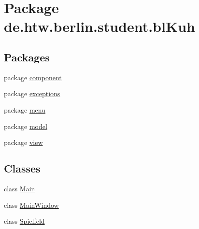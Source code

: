 \hypertarget{namespacede_1_1htw_1_1berlin_1_1student_1_1bl_kuh}{\section{Package de.\-htw.\-berlin.\-student.\-bl\-Kuh}
\label{namespacede_1_1htw_1_1berlin_1_1student_1_1bl_kuh}
}
\subsection*{Packages}
\begin{DoxyCompactItemize}
\item 
package \hyperlink{namespacede_1_1htw_1_1berlin_1_1student_1_1bl_kuh_1_1component}{component}
\item 
package \hyperlink{namespacede_1_1htw_1_1berlin_1_1student_1_1bl_kuh_1_1exceptions}{exceptions}
\item 
package \hyperlink{namespacede_1_1htw_1_1berlin_1_1student_1_1bl_kuh_1_1menu}{menu}
\item 
package \hyperlink{namespacede_1_1htw_1_1berlin_1_1student_1_1bl_kuh_1_1model}{model}
\item 
package \hyperlink{namespacede_1_1htw_1_1berlin_1_1student_1_1bl_kuh_1_1view}{view}
\end{DoxyCompactItemize}
\subsection*{Classes}
\begin{DoxyCompactItemize}
\item 
class \hyperlink{classde_1_1htw_1_1berlin_1_1student_1_1bl_kuh_1_1_main}{Main}
\item 
class \hyperlink{classde_1_1htw_1_1berlin_1_1student_1_1bl_kuh_1_1_main_window}{Main\-Window}
\item 
class \hyperlink{classde_1_1htw_1_1berlin_1_1student_1_1bl_kuh_1_1_spielfeld}{Spielfeld}
\end{DoxyCompactItemize}
